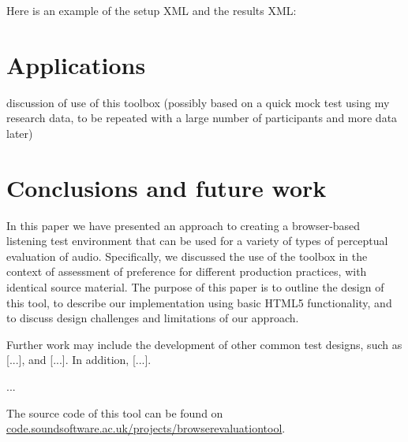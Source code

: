 \documentclass{article}
\begin{document}
Here is an example of the setup XML and the results XML:

\section{Applications}\label{sec:applications} %

discussion of use of this toolbox (possibly based on a quick mock test using my research data, to be repeated with a large number of participants and more data later)\\


\section{Conclusions and future work}\label{sec:conclusions}

In this paper we have presented an approach to creating a browser-based listening test environment that can be used for a variety of types of perceptual evaluation of audio. 
Specifically, we discussed the use of the toolbox in the context of assessment of preference for different production practices, with identical source material. 
The purpose of this paper is to outline the design of this tool, to describe our implementation using basic HTML5 functionality, and to discuss design challenges and limitations of our approach. %

Further work may include the development of other common test designs, such as [...], and [...]. In addition, [...]. 

...

The source code of this tool can be found on \url{code.soundsoftware.ac.uk/projects/browserevaluationtool}.



\end{document}
